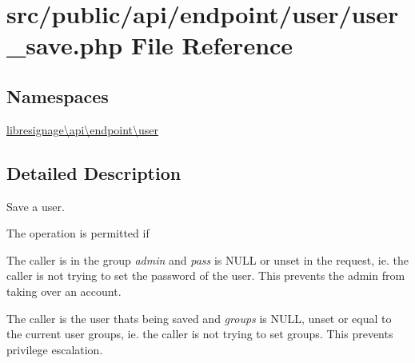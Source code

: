 \hypertarget{src_2public_2api_2endpoint_2user_2user__save_8php}{}\section{src/public/api/endpoint/user/user\+\_\+save.php File Reference}
\label{src_2public_2api_2endpoint_2user_2user__save_8php}
\subsection*{Namespaces}
\begin{DoxyCompactItemize}
\item 
 \hyperlink{namespacelibresignage_1_1api_1_1endpoint_1_1user}{libresignage\textbackslash{}api\textbackslash{}endpoint\textbackslash{}user}
\end{DoxyCompactItemize}


\subsection{Detailed Description}
Save a user.


\begin{DoxyItemize}
\item The operation is permitted if
\begin{DoxyItemize}
\item The caller is in the group {\itshape admin} and {\itshape pass} is N\+U\+LL or unset in the request, ie. the caller is not trying to set the password of the user. This prevents the admin from taking over an account.
\item The caller is the user that\textquotesingle{}s being saved and {\itshape groups} is N\+U\+LL, unset or equal to the current user groups, ie. the caller is not trying to set groups. This prevents privilege escalation.
\end{DoxyItemize}
\end{DoxyItemize}


